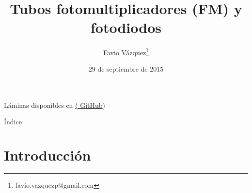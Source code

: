\documentclass[a4paper,10pt]{beamer}
\begin{document}
\begin{frame}
\Large
\title{Tubos fotomultiplicadores (FM) y fotodiodos}
\author{Favio Vázquez\footnote{favio.vazquezp@gmail.com}}
\date{$29$ de septiembre de 2015}

Láminas disponibles en \href{https://github.com/FavioVazquez/DeteccionRayosCosmicos-PCF}{(\color{blue} GitHub})

\maketitle
\end{frame}

\begin{frame}[allowframebreaks]{Índice}

\tableofcontents

\end{frame}

\section{Introducción}
\end{document}
